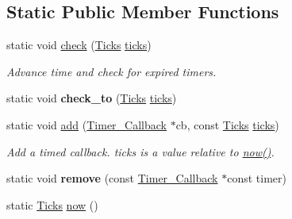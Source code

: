 \subsection*{Static Public Member Functions}
\begin{DoxyCompactItemize}
\item 
\hypertarget{classGUI_1_1Timer_aca48b51e64a4b4e4fdcc83f0edb06f0a}{static void \hyperlink{classGUI_1_1Timer_aca48b51e64a4b4e4fdcc83f0edb06f0a}{check} (\hyperlink{namespaceGUI_af396fee5d5c26b98218f5803f85e3b65}{Ticks} \hyperlink{classGUI_1_1Timer_a619f8c17a217a4524de5ba0e2562870e}{ticks})}\label{classGUI_1_1Timer_aca48b51e64a4b4e4fdcc83f0edb06f0a}

\begin{DoxyCompactList}\small\item\em Advance time and check for expired timers. \end{DoxyCompactList}\item 
\hypertarget{classGUI_1_1Timer_a2616b1e281ffe597d0f542f990a696d6}{static void {\bfseries check\-\_\-to} (\hyperlink{namespaceGUI_af396fee5d5c26b98218f5803f85e3b65}{Ticks} \hyperlink{classGUI_1_1Timer_a619f8c17a217a4524de5ba0e2562870e}{ticks})}\label{classGUI_1_1Timer_a2616b1e281ffe597d0f542f990a696d6}

\item 
static void \hyperlink{classGUI_1_1Timer_a98c2196c1df33283c26777acf9aeffee}{add} (\hyperlink{structGUI_1_1Timer__Callback}{Timer\-\_\-\-Callback} $\ast$cb, const \hyperlink{namespaceGUI_af396fee5d5c26b98218f5803f85e3b65}{Ticks} \hyperlink{classGUI_1_1Timer_a619f8c17a217a4524de5ba0e2562870e}{ticks})
\begin{DoxyCompactList}\small\item\em Add a timed callback. {\ttfamily ticks} is a value relative to \hyperlink{classGUI_1_1Timer_aeaf90bbc6251a55bb4f8c839813592bf}{now()}. \end{DoxyCompactList}\item 
\hypertarget{classGUI_1_1Timer_a3d328496c043ab353b16990270c6adf8}{static void {\bfseries remove} (const \hyperlink{structGUI_1_1Timer__Callback}{Timer\-\_\-\-Callback} $\ast$const timer)}\label{classGUI_1_1Timer_a3d328496c043ab353b16990270c6adf8}

\item 
\hypertarget{classGUI_1_1Timer_aeaf90bbc6251a55bb4f8c839813592bf}{static \hyperlink{namespaceGUI_af396fee5d5c26b98218f5803f85e3b65}{Ticks} \hyperlink{classGUI_1_1Timer_aeaf90bbc6251a55bb4f8c839813592bf}{now} ()}\label{classGUI_1_1Timer_aeaf90bbc6251a55bb4f8c839813592bf}


\end{DoxyCompactItemize}
